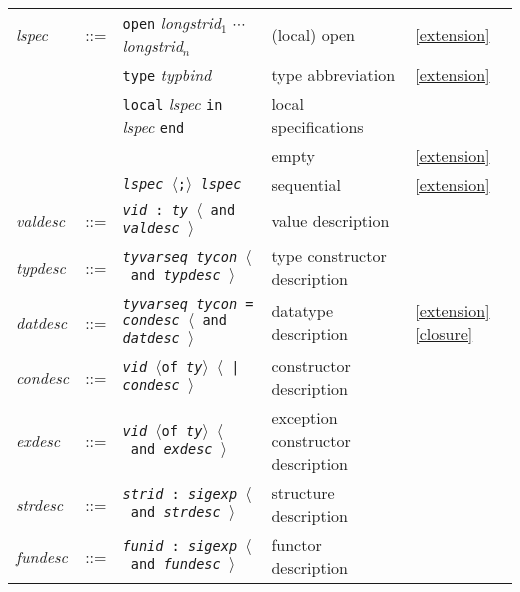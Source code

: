 \documentclass[fleqn,a4paper]{article}
\newcounter{extension}
\newcommand{\x}[1][]{\ref{extension}{#1}}
\newcommand{\la}{$\langle$}
\newcommand{\ra}{$\rangle$}
\begin{document}
\begin{tabular}{lllll}
{\it lspec} & ::= & {\tt open} {\it longstrid$_1$\/} $\cdots$\ {\it
  longstrid$_n$\/}
                                        & (local) open & \x \\
& & {\tt type} {\it typbind}            & type abbreviation & \x \\
& & {\tt local} {\it lspec\/} {\tt in} {\it lspec} {\tt end}
        & local specifications & \\
& &                                             & empty & \x \\
& & {\tt {\it lspec\/} $\langle${;}$\rangle$ {\it lspec\/}} & sequential& \x\\[2ex]

{\it valdesc\/} & ::= & {\tt {\it vid\/} :\ {\it ty\/} \la\ and {\it
    valdesc\/} \ra} & value description\\[2ex]

{\it typdesc\/} & ::= & {\tt {\it tyvarseq\/} {\it tycon\/} \la\ and
  {\it typdesc\/} \ra} & type constructor description\\[2ex]
        
{\it datdesc\/} & ::= & {\tt {\it tyvarseq\/} {\it tycon\/} = {\it
    condesc\/} \la\ and {\it datdesc\/} \ra} & datatype description & \x[\ref{closure}] \\[2ex]

{\it condesc\/} & ::= & {\tt {\it vid\/} \la{of} {\it ty\/}\ra\ 
\la\ | {\it condesc\/} \ra} & constructor description\\[2ex]

{\it exdesc\/} & ::= & {\tt {\it vid\/} \la{of} {\it ty\/}\ra\ \la\
  and {\it exdesc\/} \ra} & exception constructor description\\[2ex]

{\it strdesc\/} & ::= & {\tt {\it strid\/} :\ {\it sigexp\/} 
\la\ and {\it strdesc\/} \ra} & structure description\\[2ex]

{\it fundesc\/} & ::= & {\tt {\it funid\/} :\ {\it sigexp\/} 
\la\ and {\it fundesc\/} \ra} & functor description\\[2ex]
\end{tabular}
\end{document}

